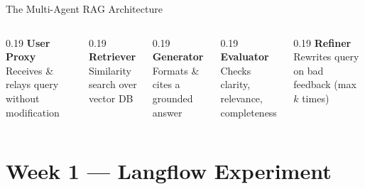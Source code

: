 \documentclass[aspectratio=169]{beamer}
\begin{document}
\begin{frame}{The Multi-Agent RAG Architecture}
  \vspace{0.2cm}
  \begin{columns}[T]
    \small
    \begin{column}{0.19\textwidth}
      \textbf{\textcolor{primary}{ User Proxy}}\\
      Receives \& relays query without modification
    \end{column}
    \begin{column}{0.19\textwidth}
      \textbf{\textcolor{primary}{ Retriever}}\\
      Similarity search over vector DB
    \end{column}
    \begin{column}{0.19\textwidth}
      \textbf{\textcolor{primary}{ Generator}}\\
      Formats \& cites a grounded answer
    \end{column}
    \begin{column}{0.19\textwidth}
      \textbf{\textcolor{primary}{ Evaluator}}\\
      Checks clarity, relevance, completeness
    \end{column}
    \begin{column}{0.19\textwidth}
      \textbf{\textcolor{primary}{ Refiner}}\\
      Rewrites query on bad feedback (max $k$ times)
    \end{column}
  \end{columns}
\end{frame}

\section{Week 1 — Langflow Experiment}
\end{document}
